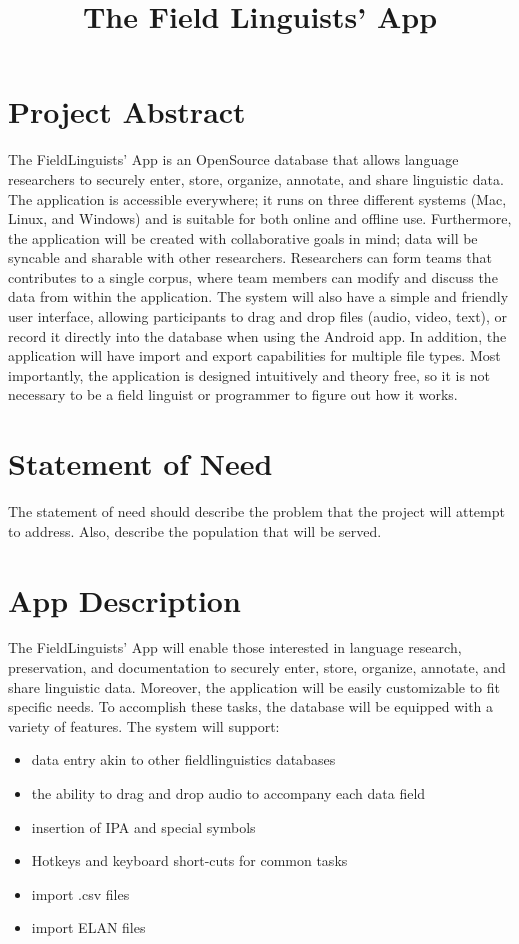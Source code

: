 \documentclass[12 pt]{article}
\title{The Field Linguists' App}
\author{}
\date{}
\begin{document}
\maketitle{}

\section {Project Abstract}

The FieldLinguists' App is an OpenSource database that allows language researchers to securely enter, store, organize, annotate, and share linguistic data. The application is accessible everywhere; it runs on three different systems (Mac, Linux, and Windows)  and is suitable for both online and offline use.  Furthermore, the application will be created with collaborative goals in mind;  data will be syncable and sharable with other researchers.  Researchers can form teams that contributes to a single corpus, where team members can modify and discuss the data from within the application. The system will also have a simple and friendly user interface, allowing participants to drag and drop files (audio, video, text), or record it directly into the database when using the Android app. In addition, the application will have import and export capabilities for multiple file types.  Most importantly, the application is designed intuitively and theory free, so it is not necessary to be a field linguist or programmer to figure out how it works.

\section {Statement of Need}

The statement of need should describe the problem that the project will attempt to address. Also, 
describe the population that will be served.  

\section {App Description}

The FieldLinguists' App will enable those interested in language research, preservation, and documentation to securely enter, store, organize, annotate, and share linguistic data. Moreover, the application will be easily customizable to fit specific needs. To accomplish these tasks, the database will be equipped with a variety of features. The system will support:

\begin{itemize}

\item data entry akin to other fieldlinguistics databases
\item the ability to drag and drop audio to accompany each data field
\item insertion of IPA and special symbols
\item Hotkeys and keyboard short-cuts for common tasks
\item import .csv files
\item import ELAN files

\end{itemize}
\end{document}
